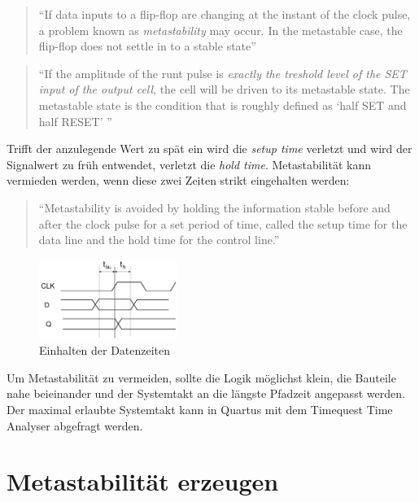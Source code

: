 \begin{quote}
``If data inputs to a flip-flop are changing at the instant of the clock pulse, a problem known as \textit{metastability} may occur. In the metastable case, the flip-flop does not settle in to a stable state'' \citep{ReferenceManual}
\end{quote}

\begin{quote}
``If the amplitude of the runt pulse is \textit{exactly the treshold level of the SET input of the output cell}, the cell will be driven to its metastable state. The metastable state is the condition that is roughly defined as `half SET and half RESET' '' \citep{F_metastability}
\end{quote}

Trifft der anzulegende Wert zu spät ein wird die \textit{setup time} verletzt und wird der Signalwert zu früh entwendet, verletzt die \textit{hold time}. Metastabilität kann vermieden werden, wenn diese zwei Zeiten strikt eingehalten werden:

\begin{quote}
``Metastability is avoided by holding the information stable before and after the clock pulse for a set period of time, called the setup time for the data line and the hold time for the control line.'' \citep{ReferenceManual}
\end{quote}

\begin{figure}[H]
	\includegraphics[width=0.4\textwidth]{images/metastability/kritscheZeit_FF.png}
	\caption{Einhalten der Datenzeiten}
	\label{fig.metastabil.kritisches_zeitfenster}
\end{figure}

Um Metastabilität zu vermeiden, sollte die Logik möglichst klein, die Bauteile nahe beieinander und der Systemtakt an die längste Pfadzeit angepasst werden. Der maximal erlaubte Systemtakt kann in Quartus mit dem Timequest Time Analyser abgefragt werden.

\section{Metastabilität erzeugen}\label{sect.meatastabil_erzeugen}


